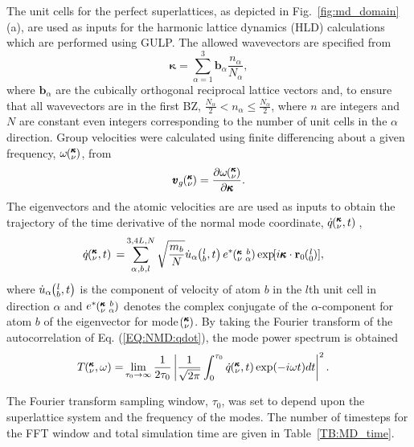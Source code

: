 \documentclass[aps,prb,preprint,preprintnumbers,amsmath,amssymb,floatfix,superscriptaddress]{revtex4}
\newcommand{\EXP}[1]{\exp\mspace{-5.0mu}\left[#1\right]\mspace{-3.0mu}}
\newcommand{\SUM}[2]{\ifthenelse{\equal{#1}{0}}{\sum_{
\alpha_{#2},b_{#2},l_{#2}}^{3,4L,N}} {\ifthenelse{\equal{#1}{1}}{\sum_{
\alpha_{#2},b_{#2}}^{3,n}}{\sum_{\pmb{\kappa}#2,\nu#2}^{N,3n}}}}
\newcommand{\ab}[2]{\mspace{-4.0mu}\left(\mspace{-8.0mu}
\begin{smallmatrix}&\ifthenelse{\equal{#1}{}}{a}{#1} \\&\ifthenelse
{\equal{#2}{}}{b}{#2}\end{smallmatrix}\mspace{-3.0mu}\right)}
\newcommand{\kvba}{\mspace{-4.0mu}\left(\mspace{-8.0mu}
\begin{smallmatrix} &\pmb{\kappa} &b \\ &\nu &\alpha\end{smallmatrix}
\mspace{-3.0mu}\right)}
\newcommand{\kvt}{\mspace{-4.0mu}\left(\mspace{-8.0mu}
\begin{smallmatrix}&\pmb{\kappa} \\&\nu\end{smallmatrix}
\mspace{-2.0mu},t\right)}
\newcommand{\kvw}{\mspace{-4.0mu}\left(\mspace{-8.0mu}
\begin{smallmatrix}&\pmb{\kappa} \\&\nu\end{smallmatrix}
\mspace{-2.0mu},\omega\right)}
\newcommand{\kv}{\mspace{-4.0mu}\left(\mspace{-8.0mu}
\begin{smallmatrix}&\pmb{\kappa} \\&\nu\end{smallmatrix}
\mspace{-3.0mu}\right)}
\newcommand{\lbt}{\mspace{-4.0mu}\left(\mspace{-8.0mu}
\begin{smallmatrix}&l \\&b\end{smallmatrix}\mspace{-2.0mu},t\right)}
\begin{document}
The unit cells for the perfect superlattices, as depicted in Fig.~\ref{fig:md_domain}(a), are used as inputs for the harmonic lattice dynamics (HLD) calculations which are performed using GULP.\cite{GULP} The allowed wavevectors are specified from
\begin{equation}\label{EQ:NMD:allowdkpt}
\pmb{\kappa} = \sum_{\alpha=1}^3 \pmb{b}_{\alpha} \frac{n_{\alpha}}{N_{\alpha}},
\end{equation}
where $\pmb{b}_\alpha$ are the cubically orthogonal reciprocal lattice vectors and, to ensure that all wavevectors are in the first BZ, $ \frac{N_\alpha}{2} < n_\alpha \le \frac {N_\alpha}{2}$, where $n$ are integers and $N$ are constant even integers corresponding to the number of unit cells in the $\alpha$ direction. Group velocities were calculated using finite differencing about a given frequency, $\omega \kv$, from \cite{ziman_electrons_2001}
\begin{equation}\label{EQ:NMD:vg}
\begin{split}
\pmb{v}_{g}\kv=\frac{\partial \omega \kv}{\partial \pmb{\kappa}}.
\end{split}
\end{equation}
The eigenvectors and the atomic velocities are are used as inputs to obtain the trajectory of the time derivative of the normal mode coordinate, $\dot{q}\kvt{}{}{}$, 
\begin{equation}\label{EQ:NMD:qdot}
\begin{split}
\dot{q}\kvt{}{}{}=&\SUM{0}{}\sqrt{\frac{m_b}{N}}\dot{u}_{\alpha}\lbt e^*\kvba\EXP{i\pmb{\kappa}\cdot\mathbf{r}_0\ab{l}{0}},
\end{split}
\end{equation}
where $\dot{u}_{\alpha}\lbt$ is the component of velocity of atom $b$ in the $l$th unit cell in direction $\alpha$ and $e^*\kvba$ denotes the complex conjugate of the $\alpha$-component for atom $b$ of the eigenvector for mode $\kv$. By taking the Fourier transform of the autocorrelation of Eq. (\ref{EQ:NMD:qdot}), the mode power spectrum is obtained \cite{dove_introduction_1993-3}
\begin{equation}\label{EQ:NMD:SED}
\begin{split}
T\kvw=&\lim_{\tau_0\rightarrow\infty}\frac{1}{2\tau_0}\left|\frac{1}{\sqrt{2\pi}}\int_{0}^{\tau_0}\dot{q}\kvt\exp(-i\omega t)dt\right|^2.
\end{split}
\end{equation}

The Fourier transform sampling window, $\tau_0$, was set to depend upon the superlattice system and the frequency of the modes. The number of timesteps for the FFT window and total simulation time are given in Table~\ref{TB:MD_time}.
\end{document}
